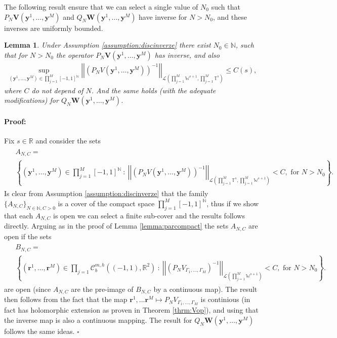 \documentclass{article}
\newtheorem{lemma}[theorem]{Lemma}
\newenvironment{proof}{\paragraph{Proof:}}{\hfill$\square$}
\newcommand{\IN}{{\mathbb N}}
\newcommand{\IR}{{\mathbb R}}
\newcommand{\IT}{{\mathbb T}}
\newcommand{\IW}{{\mathbb W}}
\newcommand{\rgeoh}[2]{\mathcal{C}_b^{#1,#2}\left( (-1,1), \IR^2 \right)}
\newcommand{\br}{\bm{r}}
\newcommand{\by}{\bm{y}}
\begin{document}
The following result ensure that we can select a single value of $N_0$ such that $P_N\mathbf{V}(\by^1,\hdots,\by^M)$ and $Q_N\mathbf{W}(\by^1,\hdots,\by^M)$ have inverse for $N>N_0$, and these inverses are uniformly bounded.
\begin{lemma}
\label{lemma:discreteinverse}
Under Assumption \ref{assumption:discinverze} there exist $N_0 \in \IN$, such that for $N> N_0$ the operator $P_N \mathbf{V}(\by^1,\hdots,\by^M)$ has inverse, and also 
\begin{align*}
\sup_{(\by^1,\hdots,\by^M)\in \prod_{j=1}^M[-1,1]^\IN}\left\vert \left\vert (P_N V(\by^1,\hdots,\by^M))^{-1} \right \vert \right \vert_{\mathcal{L}\left(\prod_{j=1}^M \IW^{s+1}, \prod_{j=1}^M \IT^s\right)} \leq C(s),
\end{align*}
where $C$ do not depend of $N$. And the same holds  (with the adequate modifications) for $Q_N \mathbf{W}(\by^1,\hdots,\by^M)$.
\end{lemma}
\begin{proof}
Fix $s \in \IR$ and consider the sets
\begin{align*}
\begin{split}
&A_{N,C} = \\ &\left\lbrace 
(\by^1,\hdots,\by^M) \in \prod_{j=1}^M[-1,1]^{\IN} \ : \ \left\vert \left\vert (P_N V(\by^1,\hdots,\by^M))^{-1} \right\vert \right\vert_{\mathcal{L}\left(\prod_{j=1}^M \IT^s,\prod_{j=1}^M \IW^{s+1}\right)} < C, \text{ for $N>N_0$}
\right\rbrace.
\end{split}
\end{align*}
Is clear from Assumption \ref{assumption:discinverze} that the family $\{A_{N,C}\}_{N \in \IN, C > 0}$ is a cover of the compact space $\prod_{j=1}^M[-1,1]^{\IN}$, thus if we show that each $A_{N,C}$ is open we can select a finite sub-cover and the results follows directly. Arguing as in the proof of Lemma \ref{lemma:parcompact} the sets $A_{N,C}$ are open if the sets 
\begin{align*}
\begin{split}
&B_{N,C} = \\ &\left\lbrace 
(\br^1,\hdots,\br^M) \in \prod_{j=1}\rgeoh{m}{h} \ : \ \left\vert \left\vert (P_N V_{\Gamma_1,\hdots,\Gamma_M})^{-1} \right\vert \right\vert_{\mathcal{L}\left(\prod_{j=1}^M \IW^{s+1}\right)} < C, \text{ for $N>N_0$}
\right\rbrace.
\end{split}
\end{align*}
are open (since $A_{N,C}$ are the pre-image of $B_{N,C}$ by a continuous map). The result then follows  from the fact that the map $\br^1,\hdots \br^M \mapsto P_N V_{\Gamma_1,\hdots,\Gamma_M} $  is continious (in fact has holomorphic extension as proven in Theorem \ref{thrm:Vop}), and using that the inverse map is also a continuous mapping.  
The result for $Q_N \mathbf{W}(\by^1,\hdots,\by^M)$ follows the same ideas.
\end{proof}
\end{document}
